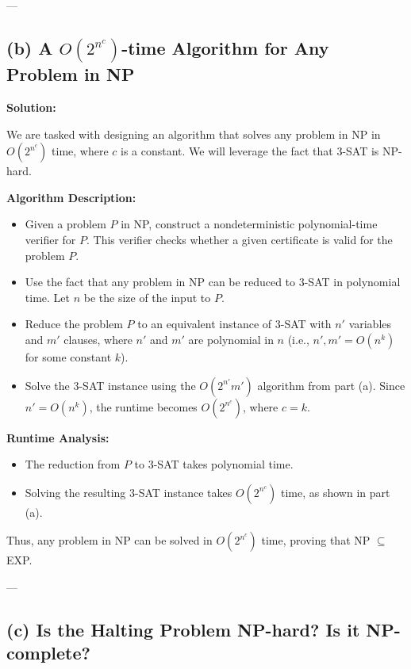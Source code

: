 \documentclass[11pt]{article}
\newenvironment{solution}{%
    \par\noindent\textbf{Solution:}\par%
}{\par}
\begin{document}
---

\subsection*{(b) A $O(2^{n^c})$-time Algorithm for Any Problem in NP}

\begin{solution}
We are tasked with designing an algorithm that solves any problem in NP in $O(2^{n^c})$ time, where $c$ is a constant. We will leverage the fact that 3-SAT is NP-hard.

\textbf{Algorithm Description:}
\begin{itemize}
    \item Given a problem $P$ in NP, construct a nondeterministic polynomial-time verifier for $P$. This verifier checks whether a given certificate is valid for the problem $P$.
    \item Use the fact that any problem in NP can be reduced to 3-SAT in polynomial time. Let $n$ be the size of the input to $P$.
    \item Reduce the problem $P$ to an equivalent instance of 3-SAT with $n'$ variables and $m'$ clauses, where $n'$ and $m'$ are polynomial in $n$ (i.e., $n', m' = O(n^k)$ for some constant $k$).
    \item Solve the 3-SAT instance using the $O(2^{n'} m')$ algorithm from part (a). Since $n' = O(n^k)$, the runtime becomes $O(2^{n^c})$, where $c = k$.
\end{itemize}

\textbf{Runtime Analysis:}
\begin{itemize}
    \item The reduction from $P$ to 3-SAT takes polynomial time.
    \item Solving the resulting 3-SAT instance takes $O(2^{n^c})$ time, as shown in part (a).
\end{itemize}

Thus, any problem in NP can be solved in $O(2^{n^c})$ time, proving that NP $\subseteq$ EXP.
\end{solution}

---

\subsection*{(c) Is the Halting Problem NP-hard? Is it NP-complete?}
\end{document}

